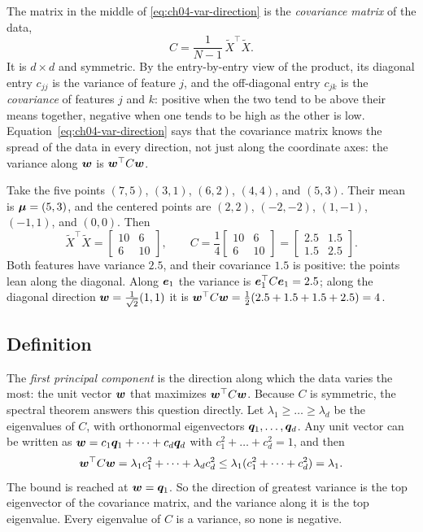 The matrix in the middle of \cref{eq:ch04-var-direction} is the
\emph{covariance matrix} of the data,
\[
  C = \frac{1}{N - 1}\, \tilde{X}^\top \tilde{X} .
\]
It is $d \times d$ and symmetric. By the entry-by-entry view of the
product, its diagonal entry $c_{jj}$ is the variance of feature $j$, and
the off-diagonal entry $c_{jk}$ is the \emph{covariance} of features $j$
and $k$: positive when the two tend to be above their means together,
negative when one tends to be high as the other is low.
Equation~\eqref{eq:ch04-var-direction} says that the covariance matrix
knows the spread of the data in every direction, not just along the
coordinate axes: the variance along $\bm{w}$ is $\bm{w}^\top C
\bm{w}$.

\begin{example}
  \label{ex:ch04-pca-data}
  Take the five points $(7, 5)$, $(3, 1)$, $(6, 2)$, $(4, 4)$, and
  $(5, 3)$. Their mean is $\bm{\mu} = (5, 3)$, and the centered points are
  $(2, 2)$, $(-2, -2)$, $(1, -1)$, $(-1, 1)$, and $(0, 0)$. Then
  \[
    \tilde{X}^\top \tilde{X}
    = \begin{bmatrix} 10 & 6 \\ 6 & 10 \end{bmatrix},
    \qquad
    C = \frac14 \begin{bmatrix} 10 & 6 \\ 6 & 10 \end{bmatrix}
      = \begin{bmatrix} 2.5 & 1.5 \\ 1.5 & 2.5 \end{bmatrix}.
  \]
  Both features have variance $2.5$, and their covariance $1.5$ is
  positive: the points lean along the diagonal. Along
  $\bm{e}_1$ the variance is $\bm{e}_1^\top C \bm{e}_1 = 2.5$; along
  the diagonal direction $\bm{w} = \frac{1}{\sqrt 2}(1, 1)$ it is
  $\bm{w}^\top C \bm{w} = \frac12 (2.5 + 1.5 + 1.5 + 2.5) = 4$.
\end{example}

\subsection{Definition}
\label{sec:ch04-pca-def}

The \emph{first principal component} is the direction along which the data
varies the most: the unit vector $\bm{w}$ that maximizes $\bm{w}^\top C
\bm{w}$. Because $C$ is symmetric, the spectral theorem answers this
question directly. Let $\lambda_1 \ge \dots \ge \lambda_d$ be the
eigenvalues of $C$, with orthonormal eigenvectors $\bm{q}_1, \dots,
\bm{q}_d$. Any unit vector can be written as $\bm{w} = c_1 \bm{q}_1 +
\dots + c_d \bm{q}_d$ with $c_1^2 + \dots + c_d^2 = 1$, and then
\[
  \bm{w}^\top C \bm{w}
  = \lambda_1 c_1^2 + \dots + \lambda_d c_d^2
  \le \lambda_1 (c_1^2 + \dots + c_d^2) = \lambda_1 .
\]
The bound is reached at $\bm{w} = \bm{q}_1$. So the direction of
greatest variance is the top eigenvector of the covariance matrix, and the
variance along it is the top eigenvalue. Every eigenvalue of $C$ is a
variance, so none is negative.

